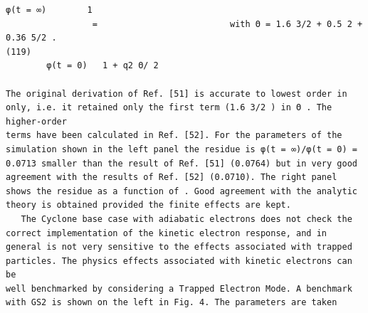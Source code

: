\documentclass[a4paper]{article}
\newcommand{\gkwpagefont}{\fontsize{6.0pt}{7.55pt}\selectfont}
\begin{document}
\begin{Verbatim}[fontsize=\gkwpagefont]
        φ(t = ∞)        1
                 =                          with Θ = 1.6 3/2 + 0.5 2 + 0.36 5/2 .                                                                                     (119)
        φ(t = 0)   1 + q2 Θ/ 2

The original derivation of Ref. [51] is accurate to lowest order in only, i.e. it retained only the first term (1.6 3/2 ) in Θ . The higher-order
terms have been calculated in Ref. [52]. For the parameters of the simulation shown in the left panel the residue is φ(t = ∞)/φ(t = 0) =
0.0713 smaller than the result of Ref. [51] (0.0764) but in very good agreement with the results of Ref. [52] (0.0710). The right panel
shows the residue as a function of . Good agreement with the analytic theory is obtained provided the finite effects are kept.
   The Cyclone base case with adiabatic electrons does not check the correct implementation of the kinetic electron response, and in
general is not very sensitive to the effects associated with trapped particles. The physics effects associated with kinetic electrons can be
well benchmarked by considering a Trapped Electron Mode. A benchmark with GS2 is shown on the left in Fig. 4. The parameters are taken
\end{Verbatim}
\newpage
\end{document}
